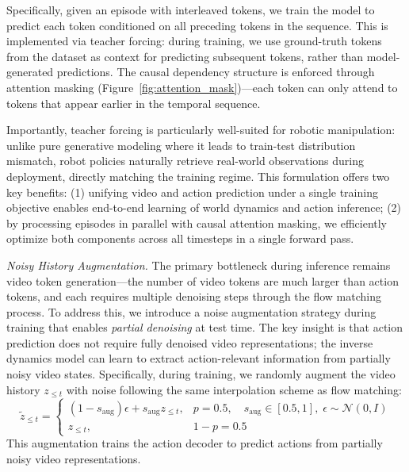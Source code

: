 \documentclass[onecolumn]{robbyant}           %
\begin{document}
Specifically, given an episode with interleaved tokens, we train the model to predict each token conditioned on all preceding tokens in the sequence.
This is implemented via teacher forcing: during training, we use ground-truth tokens from the dataset as context for predicting subsequent tokens, rather than model-generated predictions.
The causal dependency structure is enforced through attention masking (Figure~\ref{fig:attention_mask})---each token can only attend to tokens that appear earlier in the temporal sequence.


Importantly, teacher forcing is particularly well-suited for robotic manipulation: unlike pure generative modeling where it leads to train-test distribution mismatch, robot policies naturally retrieve real-world observations during deployment, directly matching the training regime.
This formulation offers two key benefits: (1) unifying video and action prediction under a single training objective enables end-to-end learning of world dynamics and action inference; (2) by processing episodes in parallel with causal attention masking, we efficiently optimize both components across all timesteps in a single forward pass.




\noindent\textit{Noisy History Augmentation.}
The primary bottleneck during inference remains video token generation---the number of video tokens are much larger than action tokens, and each requires multiple denoising steps through the flow matching process.
To address this, we introduce a noise augmentation strategy during training that enables \emph{partial denoising} at test time.
The key insight is that action prediction does not require fully denoised video representations; the inverse dynamics model can learn to extract action-relevant information from partially noisy video states.
Specifically, during training, we randomly augment the video history $z_{\leq t}$ with noise following the same interpolation scheme as flow matching:
\begin{equation}
\tilde{z}_{\leq t} = \begin{cases}
(1 - s_{\text{aug}}) \epsilon + s_{\text{aug}} z_{\leq t}, & p = 0.5, \quad s_{\text{aug}} \in [0.5, 1], \; \epsilon \sim \mathcal{N}(0, I) \\
z_{\leq t}, & 1 - p = 0.5
\end{cases}
\end{equation}
This augmentation trains the action decoder to predict actions from partially noisy video representations.
\end{document}
